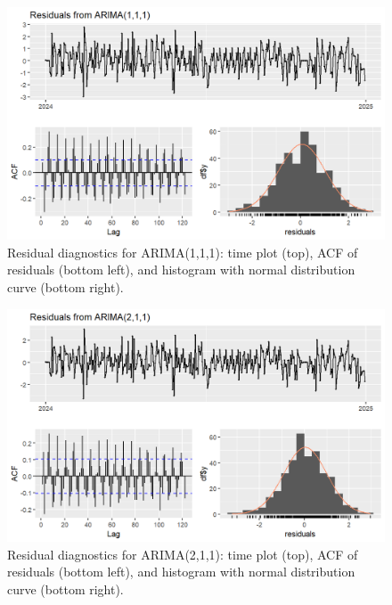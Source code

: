 \documentclass{article}
\begin{document}
\begin{figure}
  \includegraphics[width=\textwidth]{finalproject/images/arima111_resid.png}
  \caption{Residual diagnostics for ARIMA(1,1,1): time plot (top), ACF of residuals (bottom left), and histogram with normal distribution curve (bottom right).}
  \label{fig:arima111_residuals}
\end{figure}

\begin{figure}
  \includegraphics[width=\textwidth]{finalproject/images/arima211_resid.png}
  \caption{Residual diagnostics for ARIMA(2,1,1): time plot (top), ACF of residuals (bottom left), and histogram with normal distribution curve (bottom right).}
  \label{fig:arima211_residuals}
\end{figure}
\end{document}
